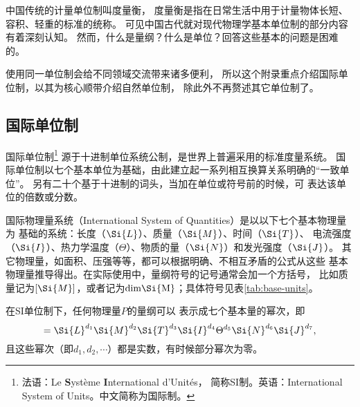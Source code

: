 中国传统的计量单位制叫度量衡，
度量衡是指在日常生活中用于计量物体长短、容积、轻重的标准的统称。
可见中国古代就对现代物理学基本单位制的部分内容有着深刻认知。
然而，什么是量纲？什么是单位？回答这些基本的问题是困难的。

使用同一单位制会给不同领域交流带来诸多便利，
所以这个附录重点介绍国际单位制，以其为核心顺带介绍自然单位制，
除此外不再赘述其它单位制了。

\subsection{国际单位制}
国际单位制{\footnote{法语：Le {\bf S}ystème {\bf I}nternational d'Unités，
        简称SI制。英语：International System of Units。中文简称为国际制。}}
源于十进制单位系统{\kaishu 公制}，是世界上普遍采用的标准度量系统。 
国际单位制以七个基本单位为基础，由此建立起一系列相互换算关系明确的“一致单位”。
另有二十个基于十进制的词头，当加在单位或符号前的时候，可
表达该单位的倍数或分数。


国际物理量系统（International System of Quantities）是以以下七个基本物理量为
基础的系统：长度（$\Si{L}$）、质量（$\Si{M}$）、时间（$\Si{T}$）、
电流强度（$\Si{I}$）、热力学温度（$\Theta$）、物质的量（$\Si{N}$）和发光强度（$\Si{J}$）。
其它物理量，如面积、压强等等，都可以根据明确、不相互矛盾的公式从这些
基本物理量推导得出。在实际使用中，量纲符号的记号通常会加一个方括号，
比如质量记为$[\Si{M}]$，或者记为$\rm{dim} \Si{M}$；具体符号见表\ref{tab:base-units}。


在SI单位制下，任何物理量$P$的量纲可以
表示成七个基本量的幂次，即
\begin{equation} %
    [P]=\Si{L}^{d_1} \Si{M}^{d_2} \Si{T}^{d_3} \Si{I}^{d_4} \Theta^{d_5} \Si{N}^{d_6} \Si{J}^{d_7} ,
\end{equation}
且这些幂次（即$d_1,d_2,\cdots$）都是实数，有时候部分幂次为零。
